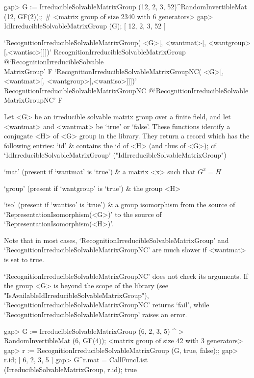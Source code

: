 \beginexample
gap> G := IrreducibleSolvableMatrixGroup (12, 2, 3, 52)^RandomInvertibleMat (12, GF(2));;
# <matrix group of size 2340 with 6 generators>
gap> IdIrreducibleSolvableMatrixGroup (G);
[ 12, 2, 3, 52 ]
\endexample


\>`RecognitionIrreducibleSolvableMatrixGroup(%
   <G>[, <wantmat>[, <wantgroup>[,<wantiso>]]])'%
{RecognitionIrreducibleSolvableMatrixGroup}%
@{`RecognitionIrreducibleSolvable\\MatrixGroup'} F
\>`RecognitionIrreducibleSolvableMatrixGroupNC(%
   <G>[, <wantmat>[, <wantgroup>[,<wantiso>]]])'%
{RecognitionIrreducibleSolvableMatrixGroupNC}%
@{`RecognitionIrreducibleSolvable\\MatrixGroupNC'} F

Let <G> be an irreducible solvable matrix group over a finite field, and let
<wantmat> and <wantmat> be `true' or `false'. 
These functions identify a conjugate <H> of <G> group in the library. 
They return a record which has the following entries:
\beginitems
`id' &  contains the id of <H> (and thus of <G>); 
    cf. `IdIrreducibleSolvableMatrixGroup'  ("IdIrreducibleSolvableMatrixGroup")

`mat' (present if `wantmat' is `true') &
    a matrix <x> such that $G^x = H$

`group' (present if `wantgroup' is `true') & the group <H> 

`iso' (present if `wantiso' is `true') & a group isomorphism from the source of
    `RepresentationIsomorphism(<G>)' to the source of `RepresentationIsomorphism(<H>)'.
    
\enditems
Note that in most cases, `RecognitionIrreducibleSolvableMatrixGroup' and `RecognitionIrreducibleSolvableMatrixGroupNC' are 
much slower if <wantmat> is set to true.   

`RecognitionIrreducibleSolvableMatrixGroupNC' does not check its arguments. If
the group <G> is beyond the scope of the {\IRREDSOL} library (see "IsAvailableIdIrreducibleSolvableMatrixGroup"), `RecognitionIrreducibleSolvableMatrixGroupNC' returns `fail', while `RecognitionIrreducibleSolvableMatrixGroup' raises an error.

\beginexample
gap> G := IrreducibleSolvableMatrixGroup (6, 2, 3, 5) ^
>         RandomInvertibleMat (6, GF(4));
<matrix group of size 42 with 3 generators>
gap> r := RecognitionIrreducibleSolvableMatrixGroup (G, true, false);;
gap> r.id;
[ 6, 2, 3, 5 ]
gap> G^r.mat = CallFuncList (IrreducibleSolvableMatrixGroup, r.id);
true
\endexample


